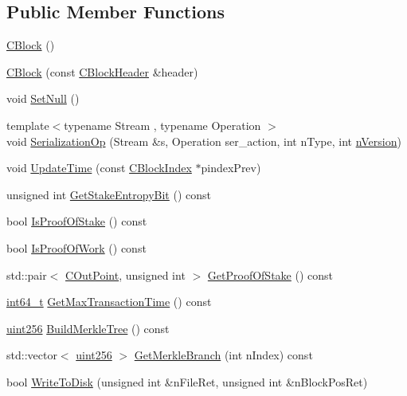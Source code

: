 \subsection*{Public Member Functions}
\begin{DoxyCompactItemize}
\item 
\hyperlink{class_c_block_aaaf8819d785559699cffbbfccb37a3b6}{C\+Block} ()
\item 
\hyperlink{class_c_block_aaeb7e05f86d36f481bbc2802768256bc}{C\+Block} (const \hyperlink{class_c_block_header}{C\+Block\+Header} \&header)
\item 
void \hyperlink{class_c_block_a0410d7ba8d60679c4cf364b82ffffea5}{Set\+Null} ()
\item 
{\footnotesize template$<$typename Stream , typename Operation $>$ }\\void \hyperlink{class_c_block_aa83bbf64300154e8919249f7778f4c17}{Serialization\+Op} (Stream \&s, Operation ser\+\_\+action, int n\+Type, int \hyperlink{class_c_block_header_ad64b7a76914741861f55f0f38ed66fb5}{n\+Version})
\item 
void \hyperlink{class_c_block_a71bb61e73b1ab6b7d4e1867a0d3a2cf8}{Update\+Time} (const \hyperlink{class_c_block_index}{C\+Block\+Index} $\ast$pindex\+Prev)
\item 
unsigned int \hyperlink{class_c_block_aa3e358ffbd3c15aa937fd8a4f8cdf0d7}{Get\+Stake\+Entropy\+Bit} () const 
\item 
bool \hyperlink{class_c_block_a42d001a1eff1d09a76b61a6ff089da35}{Is\+Proof\+Of\+Stake} () const 
\item 
bool \hyperlink{class_c_block_ac6aa1feb7deecb9fffef3978d2745903}{Is\+Proof\+Of\+Work} () const 
\item 
std\+::pair$<$ \hyperlink{class_c_out_point}{C\+Out\+Point}, unsigned int $>$ \hyperlink{class_c_block_aee66480cbb9bc01b5f1d27e6ab71f512}{Get\+Proof\+Of\+Stake} () const 
\item 
\hyperlink{stdint_8h_adec1df1b8b51cb32b77e5b86fff46471}{int64\+\_\+t} \hyperlink{class_c_block_afea5a853e484ab34d8b5fcb9faaf6c49}{Get\+Max\+Transaction\+Time} () const 
\item 
\hyperlink{classuint256}{uint256} \hyperlink{class_c_block_a930d742dbdcd7c78159d3f93431d2d3e}{Build\+Merkle\+Tree} () const 
\item 
std\+::vector$<$ \hyperlink{classuint256}{uint256} $>$ \hyperlink{class_c_block_ad857691c46c20eee278c083f7513d0f6}{Get\+Merkle\+Branch} (int n\+Index) const 
\item 
bool \hyperlink{class_c_block_a606df2cab7dc67e5dd11b157d288cf2b}{Write\+To\+Disk} (unsigned int \&n\+File\+Ret, unsigned int \&n\+Block\+Pos\+Ret)

\end{DoxyCompactItemize}
